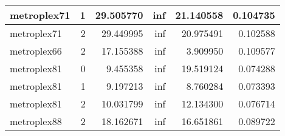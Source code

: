 \documentclass[../../../thesis.tex]{subfiles}
\begin{document}
\begin{longtable}{|l|r|r|r|r|r|}
metroplex71 & 1 & 29.505770 & inf & 21.140558 & 0.104735 \\\hline
metroplex71 & 2 & 29.449995 & inf & 20.975491 & 0.102588 \\\hline
metroplex66 & 2 & 17.155388 & inf & 3.909950 & 0.109577 \\\hline
metroplex81 & 0 & 9.455358 & inf & 19.519124 & 0.074288 \\\hline
metroplex81 & 1 & 9.197213 & inf & 8.760284 & 0.073393 \\\hline
metroplex81 & 2 & 10.031799 & inf & 12.134300 & 0.076714 \\\hline
metroplex88 & 2 & 18.162671 & inf & 16.651861 & 0.089722 \\\hline
\end{longtable}
\end{document}
